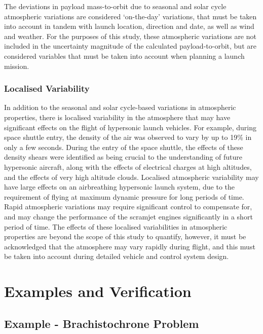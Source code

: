 The deviations in payload mass-to-orbit due to seasonal and solar cycle atmospheric variations are considered `on-the-day' variations, that must be taken into account in tandem with launch location, direction and date, as well as wind and weather. For the purposes of this study, these atmospheric variations are not included in the uncertainty magnitude of the calculated payload-to-orbit, but are considered variables that must be taken into account when planning a launch mission. 

\subsection{Localised Variability}

In addition to the seasonal and solar cycle-based variations in atmospheric properties, there is localised variability in the atmosphere that may have significant effects on the flight of hypersonic launch vehicles. For example, during space shuttle entry, the density of the air was observed to vary by up to 19\% in only a few seconds\cite{Hale2002}. During the entry of the space shuttle, the effects of these density shears were identified as being crucial to the understanding of future hypersonic aircraft, along with the effects of electrical charges at high altitudes, and the effects of very high altitude clouds. Localised atmospheric variability may have large effects on an airbreathing hypersonic launch system, due to the requirement of flying at maximum dynamic pressure for long periods of time. Rapid atmospheric variations may require significant control to compensate for, and may change the performance of the scramjet engines significantly in a short period of time. The effects of these localised variabilities in atmospheric properties are beyond the scope of this study to quantify, however, it must be acknowledged that the atmosphere may vary rapidly during flight, and this must be taken into account during detailed vehicle and control system design. 
	




	


\chapter{Examples and Verification}

\section{Example - Brachistochrone Problem}

